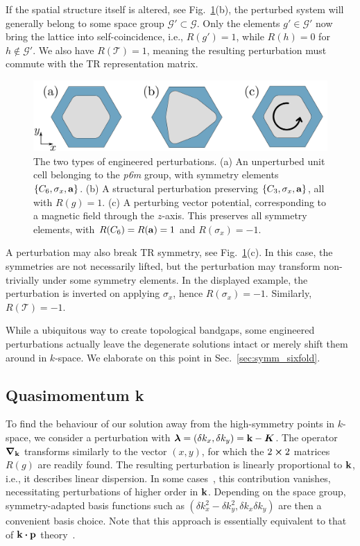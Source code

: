 If the spatial structure itself is altered, see Fig.~\ref{fig:symm_pert_types}(b), the perturbed system will generally belong to some space group $\mathcal{G'} \subset \mathcal{G}$. Only the elements $g' \in \mathcal{G'}$ now bring the lattice into self-coincidence, i.e., $R(g') = 1$, while $R(h) = 0$ for  $h \notin \mathcal{G'}$. We also have $R(\mathcal{T}) = 1$, meaning the resulting perturbation must commute with the TR representation matrix.
%
\begin{figure} [h!]
	\centering
	\includegraphics{figures/symmetries/pert_types.png}
	\caption{The two types of engineered perturbations. (a) An unperturbed unit cell belonging to the \textit{p6m} group, with symmetry elements $\{ C_6, \sigma_x, \vb{a}\}$. (b) A structural perturbation preserving $\{ C_3, \sigma_x, \vb{a}\}$, all with $R(g) = 1$. (c) A perturbing vector potential, corresponding to a magnetic field through the $z$-axis. This preserves all symmetry elements, with $R(C_6) = R(\vb{a}) = 1$ and $R(\sigma_x) = -1$.}
	\label{fig:symm_pert_types}
\end{figure}

A perturbation may also break TR symmetry, see Fig.~\ref{fig:symm_pert_types}(c). In this case, the symmetries are not necessarily lifted, but the perturbation may transform non-trivially under some symmetry elements. In the displayed example, the perturbation is inverted on applying $\sigma_x$, hence $R(\sigma_x) = -1$. Similarly, $R(\mathcal{T}) = -1$. 

While a ubiquitous way to create topological bandgaps, some engineered perturbations actually leave the degenerate solutions intact or merely shift them around in $k$-space. We elaborate on this point in Sec.~\ref{sec:symm_sixfold}. 

\subsection{Quasimomentum k} \label{sec:symm_kpert}

To find the behaviour of our solution away from the high-symmetry points in $k$-space, we consider a perturbation with $\boldsymbol{\lambda} = (\delta k_x, \delta k_y) = \vb{k} - \boldsymbol{K}$. The operator $\boldsymbol{\nabla}_{\vb{k}}$ transforms similarly to the vector $(x, y)$, for which the $2 \cross 2$ matrices $R(g)$ are readily found. The resulting perturbation is linearly proportional to $\vb{k}$, i.e., it describes linear dispersion. In some cases~\cite{Denner_2020}, this contribution vanishes, necessitating perturbations of higher order in $ \vb{k}$. Depending on the space group, symmetry-adapted basis functions such as $(\delta k_x^2- \delta k_y^2, \delta k_x \delta k_y)$ are then a convenient basis choice. Note that this approach is essentially equivalent to that of $\vb{k} \vdot \vb{p}$ theory~\cite{Dresselhaus}.

